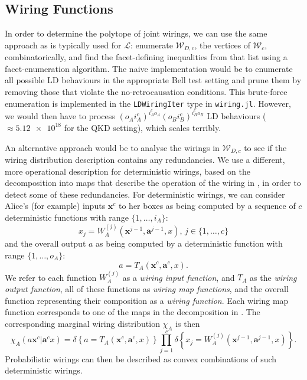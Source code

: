 \documentclass[10pt, a4paper]{article}
\numberwithin{equation}{section} %
\theoremstyle{definition}
\theoremstyle{plain}
\newcommand{\dintv}[2]{\mathopen\{#1,\ldots,#2\mathclose\}}
\newcommand{\?}{\mathrel{?}} %
\newcommand{\cvec}[1]{\boldsymbol{\mathbf{#1}}}    %
\newcommand{\indic}[1]{\delta{\left\{#1\right\}}} %
\newcommand{\sW}{\mathcal{W}}
\newcommand{\Ls}{\mathcal{L}}
\begin{document}
              \subsection{Wiring Functions}\label{sec:locwir_func}

              In order to determine the polytope of joint wirings, we can use the same approach as is typically used for \(\Ls\): enumerate \(\sW_{D,c}\), the vertices of \(\sW_c\), combinatorically, and find the facet-defining inequalities from that list using a facet-enumeration algorithm. The naive implementation would be to enumerate all possible LD behaviours in the appropriate Bell test setting and prune them by removing those that violate the no-retrocausation conditions. This brute-force enumeration is implemented in the \verb`LDWiringIter` type in \verb`wiring.jl`. However, we would then have to process \({(o_A i_A^c)}^{i_A^c o_A} {(o_B i_B^c)}^{i_B^c o_B}\) LD behaviours (\(\approx \num{5.12e18}\) for the QKD setting), which scales terribly.

              An alternative approach would be to analyse the wirings in \(\sW_{D,c}\) to see if the wiring distribution description contains any redundancies. We use a different, more operational description for deterministic wirings, based on the decomposition into maps that describe the operation of the wiring in , in order to detect some of these redundancies.  For deterministic wirings, we can consider Alice's (for example) inputs \(\cvec{x}^c\) to her boxes as being computed by a sequence of \(c\) deterministic functions with range \(\dintv{1}{i_A}\):
              \begin{equation} x_j = W^{(j)}_{A}(\cvec{x}^{j-1}, \cvec{a}^{j-1}, x),\,j \in \dintv{1}{c} \end{equation}
              and the overall output \(a\) as being computed by a deterministic function with range \(\dintv{1}{o_A}\):
              \begin{equation} a = T_{A}(\cvec{x}^{c}, \cvec{a}^{c}, x). \end{equation}
              We refer to each function \(W_{A}^{(j)}\) as a \emph{wiring input function}, and \(T_{A}\) as the \emph{wiring output function}, all of these functions as \emph{wiring map functions}, and the overall function representing their composition as a \emph{wiring function}. Each wiring map function corresponds to one of the maps in the decomposition in . The corresponding marginal wiring distribution \(\chi_{A}\) is then
              \begin{equation}
                \chi_{A}(a\cvec{x}^c|\cvec{a}^cx) = \indic{a = T_{A}(\cvec{x}^{c}, \cvec{a}^{c}, x)} \prod_{j=1}^c \indic{x_j = W^{(j)}_{A}(\cvec{x}^{j-1}, \cvec{a}^{j-1}, x)}.
              \end{equation}
              Probabilistic wirings can then be described as convex combinations of such deterministic wirings.
\end{document}
